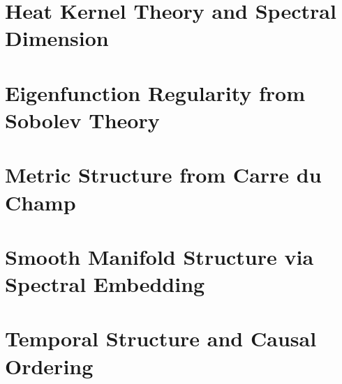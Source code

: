 \documentclass[12pt,a4paper]{article}
\begin{document}



\newpage
\section{Heat Kernel Theory and Spectral Dimension}
\label{sec:heatKernelIndependent}








\newpage
\section{Eigenfunction Regularity from Sobolev Theory}
\label{sec:regularityEmergence}





\newpage
\section{Metric Structure from Carre du Champ}
\label{sec:metricEmergence}









\newpage
\section{Smooth Manifold Structure via Spectral Embedding}
\label{sec:manifoldStructure}





\newpage
\section{Temporal Structure and Causal Ordering}
\label{sec:temporalCausality}
\end{document}
